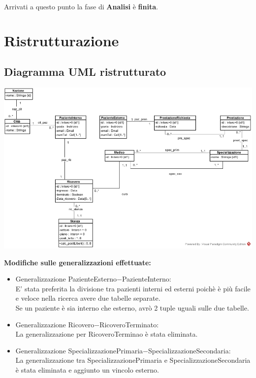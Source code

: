 \documentclass[12pt, letterpaper]{article}
\begin{document}
Arrivati a questo punto la fase di \textbf{Analisi} è \textbf{finita}.
\section{Ristrutturazione}
\subsection{Diagramma UML ristrutturato}
\begin{center}
    \includegraphics[width=1\textwidth ]{images/Ristrutturato.jpg}
\end{center}
\textbf{Modifiche sulle generalizzazioni effettuate:}
\begin{itemize}
    \item Generalizzazione PazienteEsterno$-$PazienteInterno: \\
    E' stata preferita la divisione tra pazienti interni ed esterni poichè è più facile e veloce nella ricerca avere due tabelle separate.\\
    Se un paziente è sia interno che esterno, avrò 2 tuple uguali sulle due tabelle.
    \item Generalizzazione Ricovero$-$RicoveroTerminato: \\
    La generalizzazione per RicoveroTerminao è stata eliminata.
    \item Generalizzazione SpecializzazionePrimaria$-$SpecializzazioneSecondaria: \\
    La generalizzazione tra SpecializzazionePrimaria e SpecializzazioneSecondaria è stata eliminata e aggiunto un vincolo esterno.\\

\end{itemize}
\end{document}
